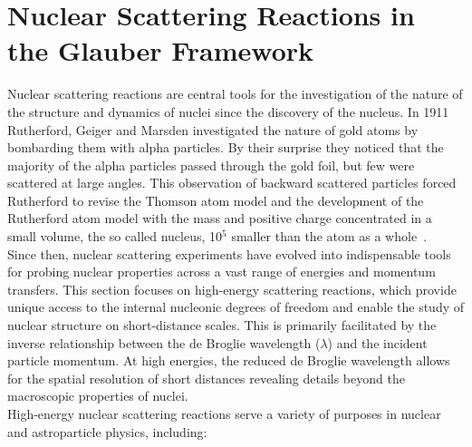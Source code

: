 \section{Nuclear Scattering Reactions in the Glauber Framework}\label{sec:reac_model}
Nuclear scattering reactions are central tools for the investigation of the nature of the structure and dynamics of nuclei since the discovery of the nucleus. In 1911 Rutherford, Geiger and Marsden investigated the nature of gold atoms by bombarding them with alpha particles. By their surprise they noticed that the majority of the alpha particles passed through the gold foil, but few were scattered at large angles. This observation of backward scattered particles forced Rutherford to revise the Thomson atom model and the development of the Rutherford atom model with the mass and positive charge concentrated in a small volume, the so called nucleus, 10$^5$ smaller than the atom as a whole~\cite{rutherford1911lxxix}.\\
Since then, nuclear scattering experiments have evolved into indispensable tools for probing nuclear properties across a vast range of energies and momentum transfers. This section focuses on high-energy scattering reactions, which provide unique access to the internal nucleonic degrees of freedom and enable the study of nuclear structure on short-distance scales. This is primarily facilitated by the inverse relationship between the de Broglie wavelength ($\lambda$) and the incident particle momentum. At high energies, the reduced de Broglie wavelength allows for the spatial resolution of short distances revealing details beyond the macroscopic properties of nuclei.\\
High-energy nuclear scattering reactions serve a variety of purposes in nuclear and astroparticle physics, including:
